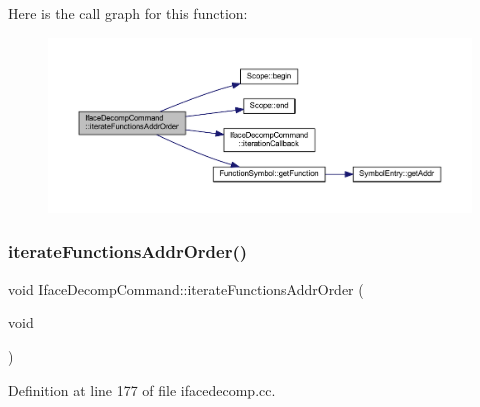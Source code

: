 Here is the call graph for this function\+:
\nopagebreak
\begin{figure}[H]
\begin{center}
\leavevmode
\includegraphics[width=350pt]{class_iface_decomp_command_a002b0fafba1c9f44ae4255a45f604148_cgraph}
\end{center}
\end{figure}
\mbox{\label{class_iface_decomp_command_a070c2e1f98082c991af6cb5a727fbd6e}} 
\subsubsection{\texorpdfstring{iterateFunctionsAddrOrder()}{iterateFunctionsAddrOrder()}\hspace{0.1cm}{\footnotesize\ttfamily [2/2]}}
{\footnotesize\ttfamily void Iface\+Decomp\+Command\+::iterate\+Functions\+Addr\+Order (\begin{DoxyParamCaption}\item[{void}]{ }\end{DoxyParamCaption})}



Definition at line 177 of file ifacedecomp.\+cc.

